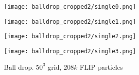 \begin{figure}[H]
    \centering
    
    \begin{minipage}[t]{6.2cm}
        \centering
        \vspace{0pt}
        \texttt{[image: balldrop\_cropped2/single0.png]}
    \end{minipage}
    \begin{minipage}[t]{6.2cm}
        \centering
        \vspace{0pt}
        \texttt{[image: balldrop\_cropped2/single1.png]}
    \end{minipage}

    \vspace{0.5cm}

    \begin{minipage}[t]{6.2cm}
        \centering
        \vspace{0pt}
        \texttt{[image: balldrop\_cropped2/single2.png]}
    \end{minipage}
    \begin{minipage}[t]{6.2cm}
        \centering
        \vspace{0pt}
        \texttt{[image: balldrop\_cropped2/single3.png]}
    \end{minipage}

    \caption{Ball drop. $50^3$ grid, $208k$ FLIP particles}
    \label{figure ball drop single}
\end{figure}

\newpage
\thispagestyle{empty}
\vspace*{-4cm}

